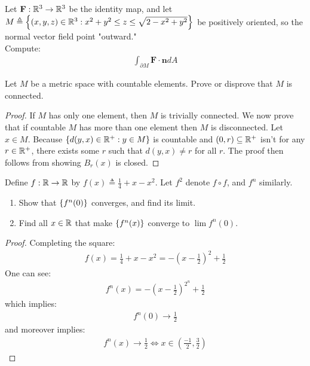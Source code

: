 \documentclass{report}
\begin{document}
\begin{question}{}{}
Let $\textbf{F}:\mathbb{R}^3 \rightarrow \mathbb{R}^3$ be the identity map, and let $M\triangleq \left\{ (x,y,z)\in\mathbb{R}^3: x^2+y^2 \leq z \leq \sqrt{2-x^2+y^2} \right\}$ be positively oriented, so the normal vector field point "outward."\\

Compute:
\begin{align*}
\int_{\partial M} \textbf{F} \cdot \textbf{n} dA
\end{align*}
\end{question}
\begin{question}{}{}
Let $M$ be a metric space with countable elements. Prove or disprove that $M$ is connected. 
\end{question}
\begin{proof}
If $M$ has only one element, then  $M$ is trivially connected. We now prove that if  countable $M$ has more than one element then  $M$ is disconnected. Let $x\in M$. Because $\left\{ d(y,x)\in\mathbb{R}^+: y \in M \right\}$ is countable and $(0,r)\subseteq \mathbb{R}^+$ isn't for any $r\in\mathbb{R}^+$,  there exists some  $r$ such that $d(y,x)\neq r$ for all $r$. The proof then follows from showing $B_r(x)$ is closed.  
\end{proof}
\begin{question}{}{}
Define $f:\mathbb{R}\rightarrow \mathbb{R}$ by $f(x)\triangleq \frac{1}{4}+x-x^2$. Let $f^2$ denote  $f \circ f$, and $f^n$ similarly.  
\begin{enumerate}[label=(\roman*)]
  \item Show that $\left\{ f^n(0) \right\}$ converges, and find its limit. 
  \item Find all $x\in\mathbb{R}$ that make $\left\{ f^n(x) \right\}$ converge to $\lim f^n(0)$. 
\end{enumerate}
\end{question}
\begin{proof}
Completing the square: 
\begin{align*}
f(x) = \frac{1}{4}+ x-x^2= - (x-\frac{1}{2})^2+ \frac{1}{2} 
\end{align*}
One can see: 
\begin{align*}
  f^n(x)= - (x- \frac{1}{2})^{2^n}+ \frac{1}{2}
\end{align*}
which implies: 
\begin{align*}
f^n(0) \rightarrow \frac{1}{2} 
\end{align*}
and moreover implies: 
\begin{align*}
  f^n(x)\rightarrow \frac{1}{2}\iff  x \in \left(\frac{-1}{2},\frac{3}{2}\right)
\end{align*}
\end{proof}
\end{document}
